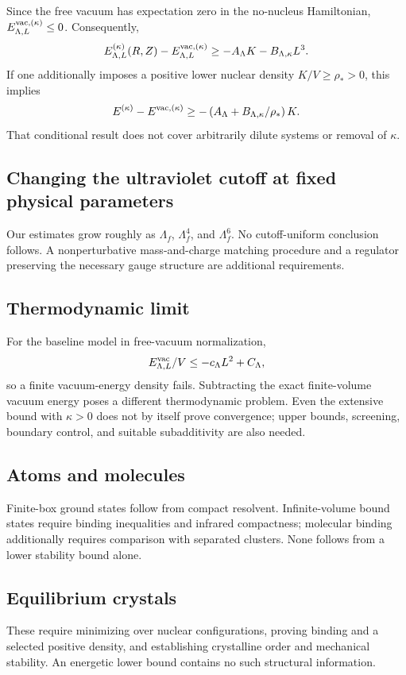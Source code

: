 Since the free vacuum has expectation zero in the no-nucleus Hamiltonian,
\(E_{\Lambda,L}^{\mathrm{vac},(\kappa)}\le0\). Consequently,
\begin{equation}
E_{\Lambda,L}^{(\kappa)}(R,Z)
-E_{\Lambda,L}^{\mathrm{vac},(\kappa)}
\ge-A_\Lambda K-B_{\Lambda,\kappa}L^3.
\end{equation}
If one additionally imposes a positive lower nuclear density
\(K/V\ge\rho_*>0\), this implies
\begin{equation}
E^{(\kappa)}-E^{\mathrm{vac},(\kappa)}
\ge-\left(A_\Lambda+B_{\Lambda,\kappa}/\rho_*\right)K.
\end{equation}
That conditional result does not cover arbitrarily dilute systems or
removal of \(\kappa\).

\subsection{Changing the ultraviolet cutoff at fixed physical parameters}
Our estimates grow roughly as \(\Lambda_f\), \(\Lambda_f^4\), and
\(\Lambda_f^6\). No cutoff-uniform conclusion follows. A nonperturbative
mass-and-charge matching procedure and a regulator preserving the
necessary gauge structure are additional requirements.

\subsection{Thermodynamic limit}
For the baseline model in free-vacuum normalization,
\begin{equation}
E^{\mathrm{vac}}_{\Lambda,L}/V\le-c_\Lambda L^2+C_\Lambda,
\end{equation}
so a finite vacuum-energy density fails. Subtracting the exact finite-volume
vacuum energy poses a different thermodynamic problem. Even the extensive
bound with \(\kappa>0\) does not by itself prove convergence; upper bounds,
screening, boundary control, and suitable subadditivity are also needed.

\subsection{Atoms and molecules}
Finite-box ground states follow from compact resolvent. Infinite-volume
bound states require binding inequalities and infrared compactness;
molecular binding additionally requires comparison with separated
clusters. None follows from a lower stability bound alone.

\subsection{Equilibrium crystals}
These require minimizing over nuclear configurations, proving binding and
a selected positive density, and establishing crystalline order and
mechanical stability. An energetic lower bound contains no such structural
information.

